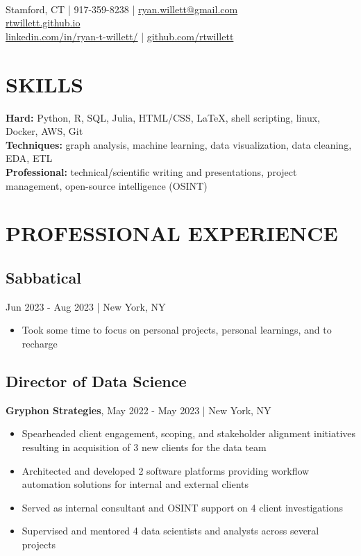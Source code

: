 \documentclass[11pt]{article}
\title{\vspace{-7cm}}
\date{}
\author{Ryan Willett}
\newenvironment{myitemize}
{ \begin{itemize}
	\setlength{\itemsep}{0pt}
	\setlength{\parskip}{0pt}
	\setlength{\parsep}{0pt}     }
{ \end{itemize}                  }
\begin{document}
\maketitle

\section*{}
  \\
\normalsize
Stamford, CT | 917-359-8238 | \href{mailto:ryan.willett@gmail.com}{ryan.willett@gmail.com} \\
\href{http://rtwillett.github.io}{rtwillett.github.io} \\
\href{https://linkedin.com/in/ryan-t-willett/}{linkedin.com/in/ryan-t-willett/} | \href{https://github.com/rtwillett}{github.com/rtwillett}

\raggedright

\section*{SKILLS}
{\bfseries Hard:} Python, R, SQL, Julia, HTML/CSS, \LaTeX, shell scripting, linux, Docker, AWS, Git \\
{\bfseries Techniques:} graph analysis, machine learning, data visualization, data cleaning, EDA, ETL \\
{\bfseries Professional:} technical/scientific writing and presentations, project management, open-source intelligence (OSINT)

\section*{PROFESSIONAL EXPERIENCE}

\subsection*{Sabbatical}
{\bfseries}Jun 2023 - Aug 2023 | New York, NY
\begin{myitemize}
	\item Took some time to focus on personal projects, personal learnings, and to recharge
\end{myitemize}

\subsection*{Director of Data Science}
{\bfseries Gryphon Strategies}, May 2022 - May 2023 | New York, NY
\begin{myitemize}
	\item Spearheaded client engagement, scoping, and stakeholder alignment initiatives resulting in acquisition of 3 new clients for the data team
	\item Architected and developed 2 software platforms providing workflow automation solutions for internal and external clients
	\item Served as internal consultant and OSINT support on 4 client investigations
	\item Supervised and mentored 4 data scientists and analysts across several projects
\end{myitemize}
\end{document}
